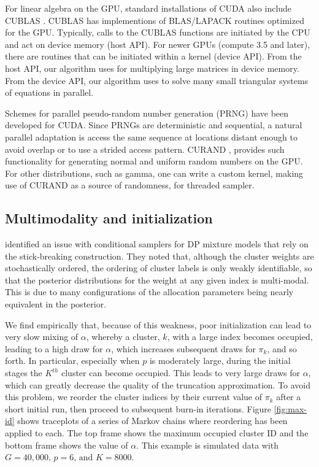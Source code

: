 For linear algebra on the GPU, standard installations of CUDA also
include CUBLAS \cite{cublas}. CUBLAS has implementions of BLAS/LAPACK
routines optimized for the GPU. Typically, calls to the CUBLAS
functions are initiated by the CPU and act on device memory (host
API). For newer GPUs (compute 3.5 and later), there are routines that
can be initiated within a kernel (device API). From the host API, our
algorithm uses  for multiplying large matrices in
device memory. From the
device API, our algorithm uses  to solve many small triangular
systems of equations in parallel.

Schemes for parallel pseudo-random number generation (PRNG) have been
developed for CUDA. Since PRNGs are deterministic and sequential, a
natural parallel adaptation is access the same sequence at locations
distant enough to avoid overlap or to use a strided access
pattern. CURAND \cite{curand}, provides such functionality for generating
normal and uniform random numbers on the GPU. For other distributions,
such as gamma,
one can write a custom kernel, making use of CURAND as a source of
randomness, for threaded sampler.

\subsection{Multimodality and initialization}
\label{subsec:initialization}
\citet{papas} identified an issue with conditional samplers for DP
mixture models that rely on the stick-breaking construction. They
noted that, although the cluster weights are stochastically
ordered, the ordering of cluster labels is only weakly identifiable,
so that the posterior distributions for the weight at any given index
is multi-modal. This is due to many configurations of the allocation
parameters being nearly equivalent in the posterior. 

We find empirically that, because of this weakness, poor initialization can
lead to very slow mixing of $\alpha$, whereby a cluster, $k$, with a large
index becomes occupied, leading to a high draw for $\alpha$, which
increases subsequent draws for $\pi_k$, and so forth. In particular,
especially when $p$ is moderately large, during the initial stages the
$K^{th}$ cluster can become occupied. This leads to very large draws
for $\alpha$, which can greatly decrease the quality of the truncation
approximation. To avoid this problem, we reorder the cluster indices by their current value of $\pi_k$ after a short initial run, then proceed to subsequent burn-in iterations. Figure \ref{fig:max-id} shows traceplots of a series of Markov chains where reordering has been applied to each. The top frame shows the maximum occupied cluster ID and the bottom frame shows the value of $\alpha$. This example is simulated data with $G=40,000,\, p=6,\, \mbox{and } K=8000$.

